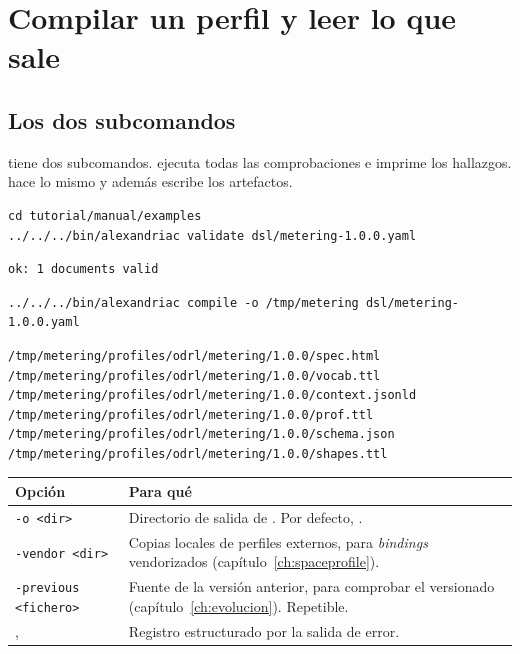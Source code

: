 \chapter{Compilar un perfil y leer lo que sale}
\label{ch:compilar}

\section{Los dos subcomandos}

 tiene dos subcomandos.  ejecuta todas las comprobaciones e imprime los
hallazgos.  hace lo mismo y además escribe los artefactos.

\begin{lstlisting}[style=sh]
cd tutorial/manual/examples
../../../bin/alexandriac validate dsl/metering-1.0.0.yaml
\end{lstlisting}
\begin{lstlisting}[style=out]
ok: 1 documents valid
\end{lstlisting}

\begin{lstlisting}[style=sh]
../../../bin/alexandriac compile -o /tmp/metering dsl/metering-1.0.0.yaml
\end{lstlisting}
\begin{lstlisting}[style=out]
/tmp/metering/profiles/odrl/metering/1.0.0/spec.html
/tmp/metering/profiles/odrl/metering/1.0.0/vocab.ttl
/tmp/metering/profiles/odrl/metering/1.0.0/context.jsonld
/tmp/metering/profiles/odrl/metering/1.0.0/prof.ttl
/tmp/metering/profiles/odrl/metering/1.0.0/schema.json
/tmp/metering/profiles/odrl/metering/1.0.0/shapes.ttl
\end{lstlisting}

\noindent\begin{tabularx}{\linewidth}{@{}L{4.6cm}Y@{}}
\toprule
\textbf{Opción} & \textbf{Para qué} \\
\midrule
\texttt{-o <dir>} & Directorio de salida de . Por defecto, . \\
\texttt{-vendor <dir>} & Copias locales de perfiles externos, para \emph{bindings} vendorizados (capítulo~\ref{ch:spaceprofile}). \\
\texttt{-previous <fichero>} & Fuente de la versión anterior, para comprobar el versionado (capítulo~\ref{ch:evolucion}). Repetible. \\
,  & Registro estructurado por la salida de error. \\
\bottomrule
\end{tabularx}


